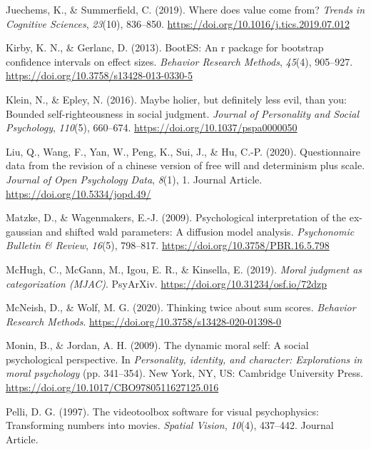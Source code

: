 \documentclass[
  english,
  man]{apa6}
\begin{document}
\leavevmode\hypertarget{ref-juechems_where_2019}{}%
Juechems, K., \& Summerfield, C. (2019). Where does value come from? \emph{Trends in Cognitive Sciences}, \emph{23}(10), 836--850. \url{https://doi.org/10.1016/j.tics.2019.07.012}

\leavevmode\hypertarget{ref-kirby_bootes_2013}{}%
Kirby, K. N., \& Gerlanc, D. (2013). BootES: An r package for bootstrap confidence intervals on effect sizes. \emph{Behavior Research Methods}, \emph{45}(4), 905--927. \url{https://doi.org/10.3758/s13428-013-0330-5}

\leavevmode\hypertarget{ref-klein_maybe_2016}{}%
Klein, N., \& Epley, N. (2016). Maybe holier, but definitely less evil, than you: Bounded self-righteousness in social judgment. \emph{Journal of Personality and Social Psychology}, \emph{110}(5), 660--674. \url{https://doi.org/10.1037/pspa0000050}

\leavevmode\hypertarget{ref-Liu_2020_JOPD}{}%
Liu, Q., Wang, F., Yan, W., Peng, K., Sui, J., \& Hu, C.-P. (2020). Questionnaire data from the revision of a chinese version of free will and determinism plus scale. \emph{Journal of Open Psychology Data}, \emph{8}(1), 1. Journal Article. \url{https://doi.org/10.5334/jopd.49/}

\leavevmode\hypertarget{ref-matzke_psychological_2009}{}%
Matzke, D., \& Wagenmakers, E.-J. (2009). Psychological interpretation of the ex-gaussian and shifted wald parameters: A diffusion model analysis. \emph{Psychonomic Bulletin \& Review}, \emph{16}(5), 798--817. \url{https://doi.org/10.3758/PBR.16.5.798}

\leavevmode\hypertarget{ref-mchugh_moral_2019}{}%
McHugh, C., McGann, M., Igou, E. R., \& Kinsella, E. (2019). \emph{Moral judgment as categorization (MJAC)}. PsyArXiv. \url{https://doi.org/10.31234/osf.io/72dzp}

\leavevmode\hypertarget{ref-mcneish_thinking_2020}{}%
McNeish, D., \& Wolf, M. G. (2020). Thinking twice about sum scores. \emph{Behavior Research Methods}. \url{https://doi.org/10.3758/s13428-020-01398-0}

\leavevmode\hypertarget{ref-monin_dynamic_2009}{}%
Monin, B., \& Jordan, A. H. (2009). The dynamic moral self: A social psychological perspective. In \emph{Personality, identity, and character: Explorations in moral psychology} (pp. 341--354). New York, NY, US: Cambridge University Press. \url{https://doi.org/10.1017/CBO9780511627125.016}

\leavevmode\hypertarget{ref-Pelli_1997}{}%
Pelli, D. G. (1997). The videotoolbox software for visual psychophysics: Transforming numbers into movies. \emph{Spatial Vision}, \emph{10}(4), 437--442. Journal Article.
\end{document}
